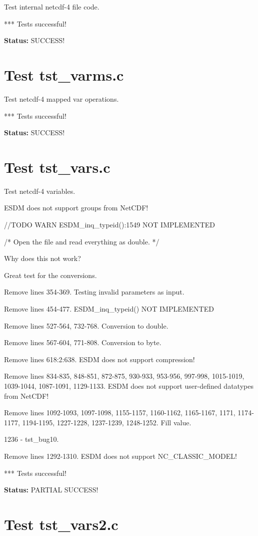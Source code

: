 Test internal netcdf-4 file code.

*** Tests successful!

{\bf \large Status: } SUCCESS!

\section{Test tst\_varms.c}

Test netcdf-4 mapped var operations.

*** Tests successful!

{\bf \large Status: } SUCCESS!

\section{Test tst\_vars.c}

Test netcdf-4 variables.

ESDM does not support groups from NetCDF!

//TODO WARN ESDM\_inq\_typeid():1549 NOT IMPLEMENTED

/* Open the file and read everything as double. */

Why does this not work?

Great test for the conversions.

Remove lines 354-369. Testing invalid parameters as input.

Remove lines 454-477. ESDM\_inq\_typeid() NOT IMPLEMENTED

Remove lines 527-564, 732-768. Conversion to double.

Remove lines 567-604, 771-808. Conversion to byte.

Remove lines 618:2:638. ESDM does not support compression!

Remove lines 834-835, 848-851, 872-875, 930-933, 953-956, 997-998, 1015-1019, 1039-1044, 1087-1091, 1129-1133. ESDM does not support user-defined datatypes from NetCDF!

Remove lines 1092-1093, 1097-1098, 1155-1157, 1160-1162, 1165-1167, 1171, 1174-1177, 1194-1195, 1227-1228, 1237-1239, 1248-1252. Fill value.

1236 - tst\_bug10.

Remove lines 1292-1310. ESDM does not support NC\_CLASSIC\_MODEL!

*** Tests successful!

{\bf \large Status: } PARTIAL SUCCESS!

\section{Test tst\_vars2.c}

